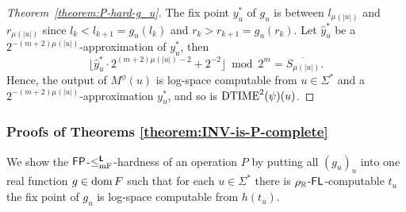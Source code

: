 \documentclass[envcountsame,orivec,oribibl]{llncs}
\begin{document}
\begin{proof}[Theorem~\ref{theorem:P-hard-g_u}]
 The fix point $y^*_u$ of $g_u$ is between $l_{\mu(|u|)}$ and $r_{\mu(|u|)}$ 
 since $l_k < l_{k+1} = g_u(l_k)$ and $r_k > r_{k+1} = g_u(r_k)$.
 Let $\hat y^*_u$ be a $2^{-(m+2)\mu(|u|)}$-approximation of $y^*_u$, then
\begin{equation}
 \lfloor \hat y^*_u \cdot 2^{(m+2)\mu(|u|)-2} + 2^{-2}\rfloor  \bmod 2^m
  =
  \overline{S_{\mu(|u|)}}.
\end{equation}
 Hence, the output of $M^\phi(u)$ is log-space computable from 
 $u \in \Sigma^*$ and a $2^{-(m+2)\mu(|u|)}$-approximation $y^*_u$, and so is
 $\mathrm{DTIME}^2(\psi)(u)$.
\end{proof}


\subsubsection{Proofs of Theorems \ref{theorem:INV-is-P-complete}}
\label{section:proofs-of-theorems}

We show the $\mathsf{FP}$-$\leq _{\mathrm{mF}} ^{\text{\bfseries \sffamily \upshape L}}$-hardness of an operation $P$
by putting all $(g_u)_u$ into one real function $g \in \mathop{\rm dom} F$
such that for each $u \in \Sigma^*$ there is $\rho _\mathbb R$-$\mathsf{FL}$-computable
$t_u$ the fix point of $g_u$ is log-space computable from $h(t_u)$.
\end{document}
